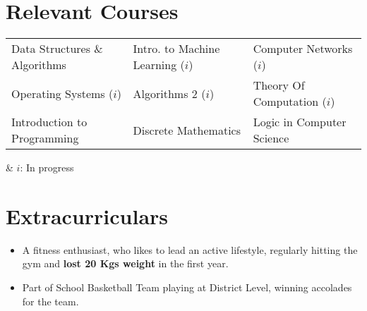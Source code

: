 \documentclass[letterpaper,10pt]{article}
\newcommand{\resumeSubHeadingListStart}{\begin{itemize}[leftmargin=*]}
\newcommand{\resumeSubHeadingListEnd}{\end{itemize}}
\begin{document}
\section{Relevant Courses}
{\fontsize{10pt}{1em}\bodyfontlight\upshape\color{text}
	\begin{tabular*}{\textwidth}{l l l}
		Data Structures \& Algorithms 
		& \hspace{6em} Intro. to Machine Learning ($i$) 
		& \hspace{6em} Computer Networks ($i$)
		\\
		Operating Systems ($i$)
		&\hspace{6em} Algorithms 2 ($i$)
		&\hspace{6em} Theory Of Computation ($i$)
		\\
		Introduction to Programming &\hspace{6em} 
		Discrete Mathematics   &\hspace{6em} 
		Logic in Computer Science  \vspace{0pt}
	\end{tabular*}
}
\hspace*{\fill} 
		& $i$: In progress\\

\vspace{-0.6cm}
\section{Extracurriculars}
\begin{itemize}
	  \item \fontsize{10pt}{1em}A fitness enthusiast, who likes to lead an active lifestyle, regularly hitting the gym and \textbf{lost 20 Kgs weight} in the first year. 
	  \item Part of School Basketball Team playing at District Level, winning accolades for the team.
\end{itemize}

%


\end{document}
